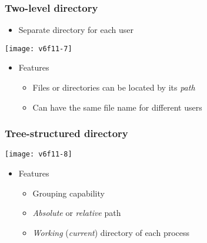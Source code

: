 \documentclass[CJKutf8,dvipsnames,table]{beamer}
\begin{document}
\begin{CJK*}{UTF8}{song}
  \begin{frame}
    \frametitle{Two-level directory} \pause
    \begin{itemize}
    \item Separate directory for each user \pause
    \end{itemize}
    \begin{center}
      \texttt{[image: v6f11-7]} \pause
    \end{center}
    \begin{itemize}
    \item Features \pause
      \begin{itemize}
      \item Files or directories can be located by its \emph{path} \pause
      \item Can have the same file name for different users
      \end{itemize}
    \end{itemize}
  \end{frame}

  \begin{frame}
    \frametitle{Tree-structured directory} \pause
    \begin{center}
      \texttt{[image: v6f11-8]} \pause
    \end{center}
    \begin{itemize}\parskip=0pt
    \item Features \pause
      \begin{itemize}\parskip=0pt
      \item Grouping capability \pause
      \item \emph{Absolute} or \emph{relative} path \pause
      \item \emph{Working} (\emph{current}) directory of each process
      \end{itemize}
    \end{itemize}
  \end{frame}


\end{CJK*}
\end{document}

